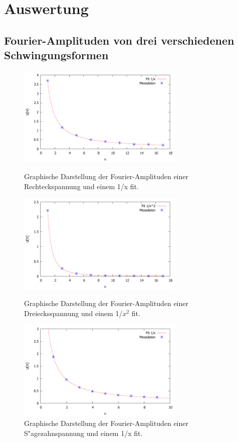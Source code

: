 \section{Auswertung}
\label{sec:auswertung}

\subsection{Fourier-Amplituden von drei verschiedenen Schwingungsformen} %
\label{sub:fourier_amplituden_von_drei_verschiedenen_}

\begin{figure}[!h]
	\centering
	\includegraphics[width = 8cm]{img/rechteck.pdf}
	\caption{Graphische Darstellung der Fourier-Amplituden einer Rechteckspannung und einem 1/x fit.}
	\label{gra:recht}

	\includegraphics[width = 8cm]{img/dreieck.pdf}
	\caption{Graphische Darstellung der Fourier-Amplituden einer Dreiecksspannung und einem 1/$x^2$ fit.}
	\label{gra:dreieck}

	\includegraphics[width = 8cm]{img/saegezahn.pdf}
	\caption{Graphische Darstellung der Fourier-Amplituden einer S"agezahnspannung und einem 1/x fit.}
	\label{gra:saege}
\end{figure}

